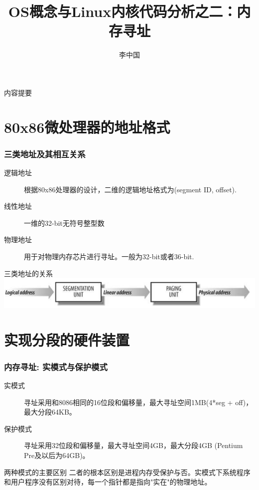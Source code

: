 \documentclass[xcolor=svgnames]{beamer}
\begin{document}
\begin{CJK*}{UTF8}{gbsn}


\title{OS概念与Linux内核代码分析之二：内存寻址}
\author{李中国}

\begin{frame}
\maketitle
\end{frame}

\begin{frame}{内容提要}
\tableofcontents[pausesections]
\end{frame}

\section{80x86微处理器的地址格式}

\begin{frame}[fragile]%
\frametitle{三类地址及其相互关系}
\begin{description}
\item[逻辑地址] 根据80x86处理器的设计，二维的逻辑地址格式为(segment ID, offset).
\item[线性地址] 一维的32-bit无符号整型数
\item[物理地址] 用于对物理内存芯片进行寻址。一般为32-bit或者36-bit.
\end{description}
\begin{block}{三类地址的关系}
\includegraphics[width=1.0\textwidth]{addresses.png}
\end{block}
\end{frame}

\section{实现分段的硬件装置}


\begin{frame}[fragile]
\frametitle{内存寻址: 实模式与保护模式}
\begin{description}
\item[实模式] 寻址采用和8086相同的16位段和偏移量，最大寻址空间1MB(4*seg + off)，最大分段64KB。
\item[保护模式] 寻址采用32位段和偏移量，最大寻址空间4GB，最大分段4GB (Pentium Pre及以后为64GB)。
\end{description}
\begin{block}{两种模式的主要区别}
二者的根本区别是进程内存受保护与否。实模式下系统程序和用户程序没有区别对待，每一个指针都是指向"实在"的物理地址。
\end{block}
\end{frame}


\end{CJK*}
\end{document}
